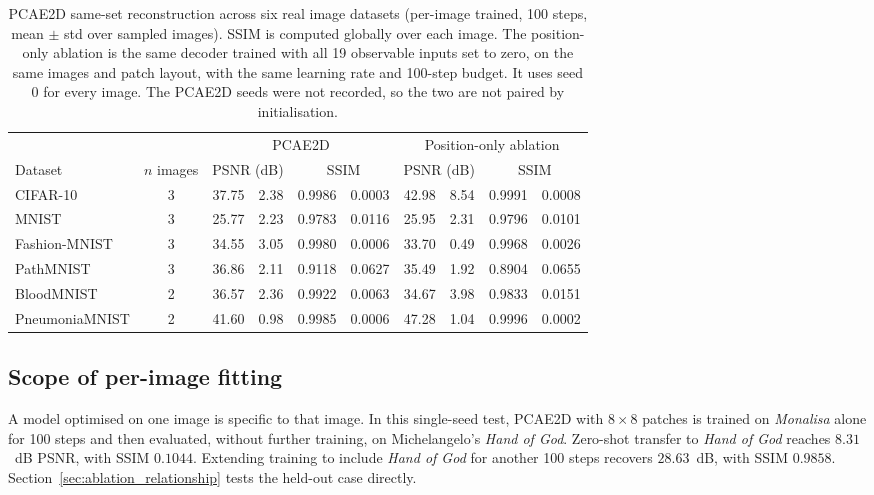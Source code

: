 \documentclass[pdflatex,sn-basic]{sn-jnl}
\begin{document}
\begin{table}[t]
  \centering
  \caption{PCAE2D same-set reconstruction across six real image datasets (per-image trained, 100 steps, mean $\pm$ std over sampled images).
  SSIM is computed globally over each image.
  The position-only ablation is the same decoder trained with all 19 observable inputs set to zero, on the same images and patch layout, with the same learning rate and 100-step budget.
  It uses seed 0 for every image.
  The PCAE2D seeds were not recorded, so the two are not paired by initialisation.}
  \label{tab:sameset_multi_dataset}
  \small
  \setlength{\tabcolsep}{4pt}
  \begin{tabular}{@{}l c r@{\,$\pm$\,}l r@{\,$\pm$\,}l r@{\,$\pm$\,}l r@{\,$\pm$\,}l@{}}
    \toprule
                     &            & \multicolumn{4}{c}{PCAE2D} & \multicolumn{4}{c}{Position-only ablation} \\
    \cmidrule(lr){3-6}\cmidrule(l){7-10}
    Dataset          & $n$ images & \multicolumn{2}{c}{PSNR (dB)} & \multicolumn{2}{c}{SSIM} & \multicolumn{2}{c}{PSNR (dB)} & \multicolumn{2}{c}{SSIM} \\
    \midrule
    CIFAR-10         & 3 & 37.75 & 2.38 & 0.9986 & 0.0003 & 42.98 & 8.54 & 0.9991 & 0.0008 \\
    MNIST            & 3 & 25.77 & 2.23 & 0.9783 & 0.0116 & 25.95 & 2.31 & 0.9796 & 0.0101 \\
    Fashion-MNIST    & 3 & 34.55 & 3.05 & 0.9980 & 0.0006 & 33.70 & 0.49 & 0.9968 & 0.0026 \\
    PathMNIST        & 3 & 36.86 & 2.11 & 0.9118 & 0.0627 & 35.49 & 1.92 & 0.8904 & 0.0655 \\
    BloodMNIST       & 2 & 36.57 & 2.36 & 0.9922 & 0.0063 & 34.67 & 3.98 & 0.9833 & 0.0151 \\
    PneumoniaMNIST   & 2 & 41.60 & 0.98 & 0.9985 & 0.0006 & 47.28 & 1.04 & 0.9996 & 0.0002 \\
    \bottomrule
  \end{tabular}
\end{table}



\subsection{Scope of per-image fitting}
\label{sec:no_generalization}

A model optimised on one image is specific to that image.
In this single-seed test, PCAE2D with $8\times8$ patches is trained on \textit{Monalisa} alone for 100 steps and then evaluated, without further training, on Michelangelo's \textit{Hand of God}.
Zero-shot transfer to \textit{Hand of God} reaches $8.31$~dB PSNR, with SSIM $0.1044$.
Extending training to include \textit{Hand of God} for another 100 steps recovers $28.63$~dB, with SSIM $0.9858$.
Section~\ref{sec:ablation_relationship} tests the held-out case directly.
\end{document}
